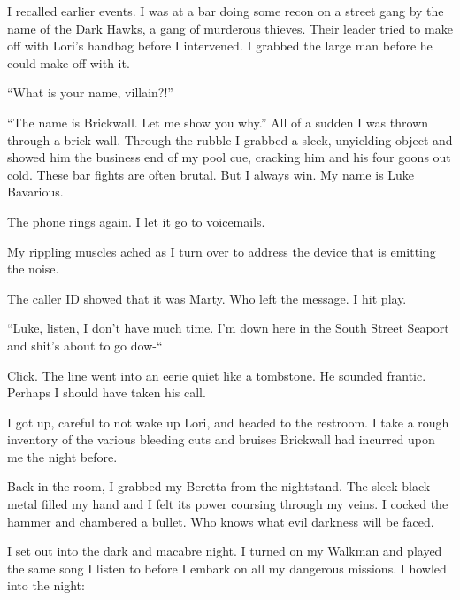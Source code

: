I recalled earlier events. I was at a bar doing some recon on a
street gang by the name of the Dark Hawks, a gang of murderous
thieves. Their leader tried to make off with Lori's handbag
before I intervened. I grabbed the large man before he could make
off with it.



``What is your name, villain?!''



``The name is Brickwall. Let me show you why.'' All of a
sudden I was thrown through a brick wall. Through the rubble I
grabbed a sleek, unyielding object and showed him the business end
of my pool cue, cracking him and his four goons out cold. These bar
fights are often brutal. But I always win. My name is Luke
Bavarious.



The phone rings again. I let it go to voicemails.



My rippling muscles ached as I turn over to address the device that
is emitting the noise.

The caller ID showed that it was Marty. Who left the message. I hit
play.



``Luke, listen, I don't have much time. I'm down
here in the South Street Seaport and shit's about to go
dow-``



Click. The line went into an eerie quiet like a tombstone. He
sounded frantic. Perhaps I should have taken his call.



I got up, careful to not wake up Lori, and headed to the restroom.
I take a rough inventory of the various bleeding cuts and bruises
Brickwall had incurred upon me the night before.



Back in the room, I grabbed my Beretta from the nightstand. The
sleek black metal filled my hand and I felt its power coursing
through my veins. I cocked the hammer and chambered a bullet. Who
knows what evil darkness will be faced.



I set out into the dark and macabre night. I turned on my Walkman
and played the same song I listen to before I embark on all my
dangerous missions. I howled into the night:



